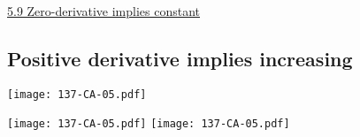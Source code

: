 \documentclass[11pt]{article}
\newcommand{\vix}{\hspace{8mm} \href{https://www.youtube.com/watch?v=l10mJLuG-U4&list=PLlwePzQY_wW9m5oabUf6hvfVfAaA9uAwM&index=9}{5.9 Zero-derivative implies constant}}
\begin{document}
\begin{videos}
\vix
\end{videos}

\newpage
\subsection{Positive derivative implies increasing}

\begin{center}
{ \texttt{[image: 137-CA-05.pdf]}} 

\vspace{-2cm}

{ \texttt{[image: 137-CA-05.pdf]}} \quad
{ \texttt{[image: 137-CA-05.pdf]}} 
\end{center}
\end{document}
